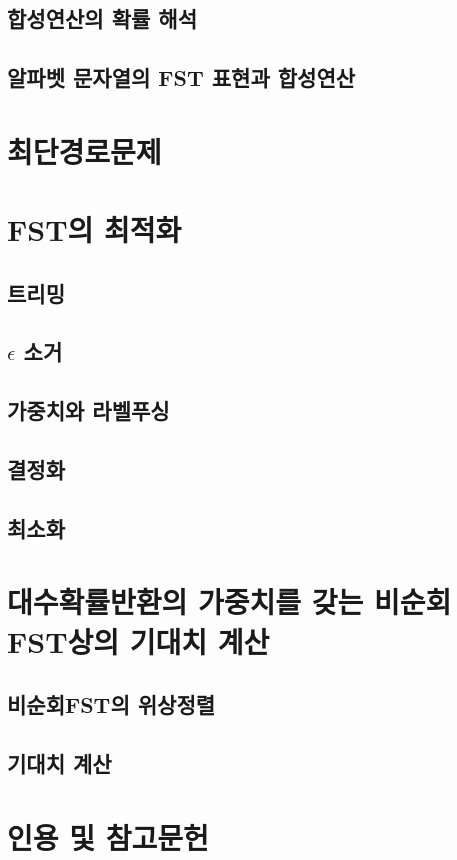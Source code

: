\documentclass[../main.tex]{subfiles}
\begin{document}
\subsection{합성연산의 확률 해석}
\subsection{알파벳 문자열의 FST 표현과 합성연산}
\section{최단경로문제}
\section{FST의 최적화}
\subsection{트리밍}
\subsection{$\epsilon$ 소거}
\subsection{가중치와 라벨푸싱}
\subsection{결정화}
\subsection{최소화}
\section{대수확률반환의 가중치를 갖는 비순회FST상의 기대치 계산}
\subsection{비순회FST의 위상정렬}
\subsection{기대치 계산}
\section*{인용 및 참고문헌}
\end{document}
